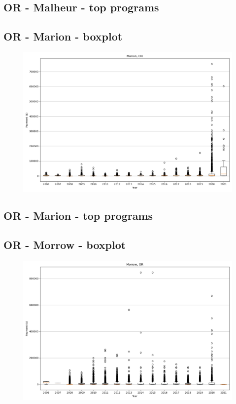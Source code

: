 \subsection*{OR - Malheur - top programs}

\newpage
\subsection*{OR - Marion - boxplot}
\begin{figure}[h]
\centering
\includegraphics[width=7in]{../output/boxplots/counties/Marion-OR_boxplot.png}
\end{figure}


\subsection*{OR - Marion - top programs}

\newpage
\subsection*{OR - Morrow - boxplot}
\begin{figure}[h]
\centering
\includegraphics[width=7in]{../output/boxplots/counties/Morrow-OR_boxplot.png}
\end{figure}


